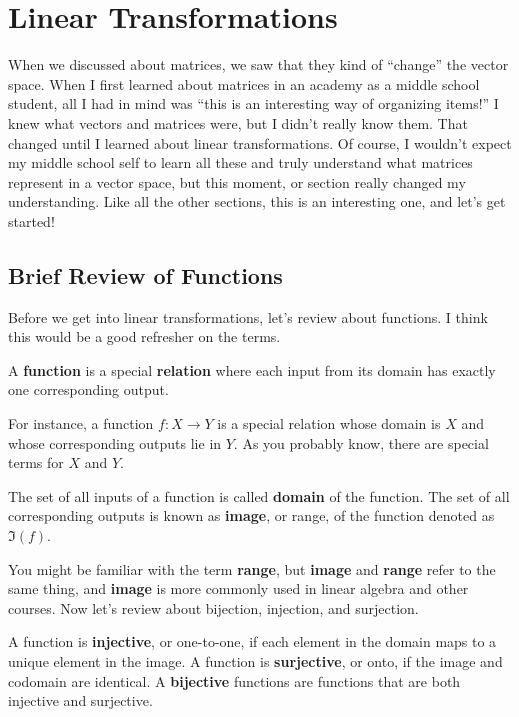 \documentclass[../../main.tex]{subfiles}
\begin{document}
\section{Linear Transformations}

When we discussed about matrices, we saw that they kind of ``change''
the vector space. When I first learned about matrices in an academy
as a middle school student, all I had in mind was ``this is an
interesting way of organizing items!'' I knew what vectors and
matrices were, but I didn't really know them. That changed until
I learned about linear transformations. Of course, I wouldn't expect
my middle school self to learn all these and truly understand what
matrices represent in a vector space, but this moment, or section
really changed my understanding. Like all the other sections, this
is an interesting one, and let's get started!

\subsection{Brief Review of Functions}

Before we get into linear transformations, let's review about
functions. I think this would be a good refresher on the terms.

\begin{definition}{}{}
A \textbf{function} is a special \textbf{relation} where each input
from its domain has exactly one corresponding output.
\end{definition}

For instance, a function $f: X \to Y$ is a special relation whose
domain is $X$ and whose corresponding outputs lie in $Y$. As you
probably know, there are special terms for $X$ and $Y$.

\begin{definition}{}{}
The set of all inputs of a function is called \textbf{domain} of the
function. The set of all corresponding outputs is known as
\textbf{image}, or range, of the function denoted as $\Im(f)$.
\end{definition}

You might be familiar with the term \textbf{range}, but \textbf{image}
and \textbf{range} refer to the same thing, and \textbf{image} is
more commonly used in linear algebra and other courses. Now let's
review about bijection, injection, and surjection.

\begin{definition}{}{}
A function is \textbf{injective}, or one-to-one, if each element in
the domain maps to a unique element in the image. A function is
\textbf{surjective}, or onto, if the image and codomain are identical.
A \textbf{bijective} functions are functions that are both injective
and surjective.
\end{definition}
\end{document}
